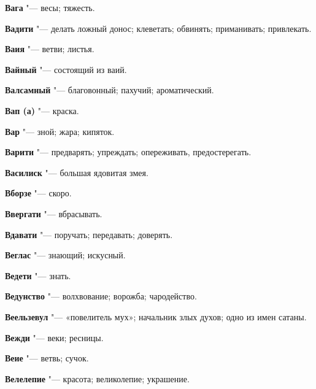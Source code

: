 \begin{mymulticols}{2}
\noindent\textbf{Вага} "--- весы; тяжесть. 




\noindent\textbf{Вадити} "--- делать ложный донос; клеветать; обвинять; приманивать; привлекать. 




\noindent\textbf{Ваия} "--- ветви; листья. 




\noindent\textbf{Вайный} "--- состоящий из ваий. 




\noindent\textbf{Валсамный} "--- благовонный; пахучий; ароматический. 




\noindent\textbf{Вап (а)} "--- краска. 




\noindent\textbf{Вар} "--- зной; жара; кипяток. 




\noindent\textbf{Варити} "--- предварять; упреждать; опереживать, предостерегать. 




\noindent\textbf{Василиск} "--- большая ядовитая змея. 




\noindent\textbf{Вборзе} "--- скоро. 




\noindent\textbf{Ввергати} "--- вбрасывать. 




\noindent\textbf{Вдавати} "--- поручать; передавать; доверять. 




\noindent\textbf{Веглас} "--- знающий; искусный. 




\noindent\textbf{Ведети} "--- знать. 




\noindent\textbf{Ведунство} "--- волхвование; ворожба; чародейство. 




\noindent\textbf{Веельзевул} "--- «повелитель мух»; начальник злых духов; одно из имен сатаны. 




\noindent\textbf{Вежди} "--- веки; ресницы. 




\noindent\textbf{Веие} "--- ветвь; сучок. 




\noindent\textbf{Велелепие} "--- красота; великолепие; украшение. 





\end{mymulticols}
